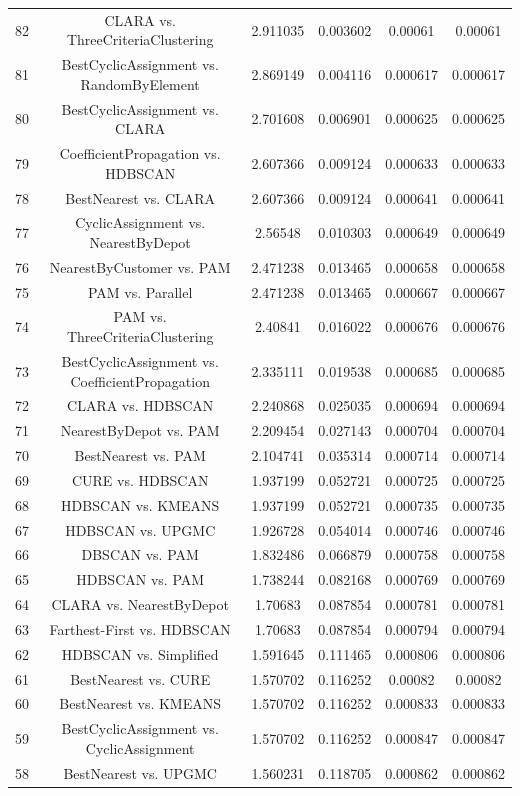 \documentclass[a4paper,10pt]{article}
\begin{document}
\begin{landscape}
\begin{table}[!htp]
\begin{tabular}{cccccc}
82&CLARA vs. ThreeCriteriaClustering&2.911035&0.003602&0.00061&0.00061\\
81&BestCyclicAssignment vs. RandomByElement&2.869149&0.004116&0.000617&0.000617\\
80&BestCyclicAssignment vs. CLARA&2.701608&0.006901&0.000625&0.000625\\
79&CoefficientPropagation vs. HDBSCAN&2.607366&0.009124&0.000633&0.000633\\
78&BestNearest vs. CLARA&2.607366&0.009124&0.000641&0.000641\\
77&CyclicAssignment vs. NearestByDepot&2.56548&0.010303&0.000649&0.000649\\
76&NearestByCustomer vs. PAM&2.471238&0.013465&0.000658&0.000658\\
75&PAM vs. Parallel&2.471238&0.013465&0.000667&0.000667\\
74&PAM vs. ThreeCriteriaClustering&2.40841&0.016022&0.000676&0.000676\\
73&BestCyclicAssignment vs. CoefficientPropagation&2.335111&0.019538&0.000685&0.000685\\
72&CLARA vs. HDBSCAN&2.240868&0.025035&0.000694&0.000694\\
71&NearestByDepot vs. PAM&2.209454&0.027143&0.000704&0.000704\\
70&BestNearest vs. PAM&2.104741&0.035314&0.000714&0.000714\\
69&CURE vs. HDBSCAN&1.937199&0.052721&0.000725&0.000725\\
68&HDBSCAN vs. KMEANS&1.937199&0.052721&0.000735&0.000735\\
67&HDBSCAN vs. UPGMC&1.926728&0.054014&0.000746&0.000746\\
66&DBSCAN vs. PAM&1.832486&0.066879&0.000758&0.000758\\
65&HDBSCAN vs. PAM&1.738244&0.082168&0.000769&0.000769\\
64&CLARA vs. NearestByDepot&1.70683&0.087854&0.000781&0.000781\\
63&Farthest-First vs. HDBSCAN&1.70683&0.087854&0.000794&0.000794\\
62&HDBSCAN vs. Simplified&1.591645&0.111465&0.000806&0.000806\\
61&BestNearest vs. CURE&1.570702&0.116252&0.00082&0.00082\\
60&BestNearest vs. KMEANS&1.570702&0.116252&0.000833&0.000833\\
59&BestCyclicAssignment vs. CyclicAssignment&1.570702&0.116252&0.000847&0.000847\\
58&BestNearest vs. UPGMC&1.560231&0.118705&0.000862&0.000862\\

\end{tabular}
\end{table}
\end{landscape}
\end{document}
